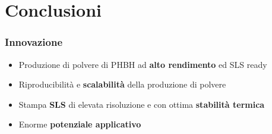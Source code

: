 \documentclass[15pt, aspectratio=169]{beamer}
\begin{document}
\begin{frame}
  
    
  
  \end{frame}


\section{Conclusioni}

  \begin{frame}
    \frametitle{Innovazione}
  

      \begin{itemize}
        \item <2-5> Produzione di polvere di PHBH ad \textbf{alto rendimento} ed SLS ready
        \item <3-5> Riproducibilità e \textbf{scalabilità} della produzione di polvere
        \item <4-5> Stampa \textbf{SLS} di elevata risoluzione e con ottima \textbf{stabilità termica}
        \item <5>   Enorme \textbf{potenziale applicativo} 
        
        \end{itemize}
  
  \end{frame}
\end{document}
